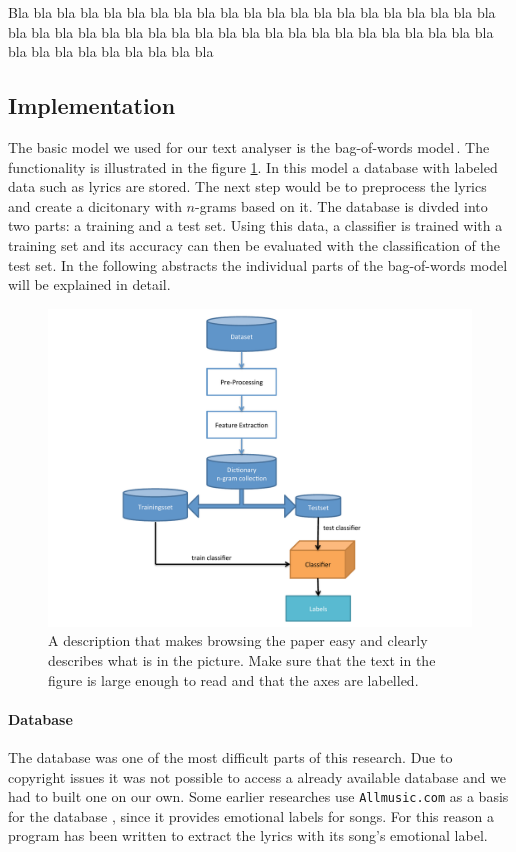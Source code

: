 \documentclass[a4paper,12pt]{article}
\begin{document}
Bla bla bla bla bla bla bla bla bla bla bla bla bla bla bla bla bla 
bla bla bla bla bla bla bla bla bla bla bla bla bla bla bla bla bla 
bla bla bla bla bla bla bla bla bla bla bla bla bla bla bla bla bla 

\subsection{Implementation}
\label{sec:impl}

The basic model we used for our text analyser is the bag-of-words model\,\cite{Mitchell}. The functionality is illustrated in the figure \ref{fig:bagOfWords}. In this model a database with labeled data such as lyrics are stored. The next step would be to preprocess the lyrics and create a dicitonary with $n$-grams based on it. The database is divded into two parts: a training and a test set. Using this data, a classifier is trained with a training set and its accuracy can then be evaluated with the classification of the test set. In the following abstracts the individual parts of the bag-of-words model will be explained in detail. 

\begin{figure}
\centering
\includegraphics[width=0.8\linewidth]{flowChartBagOfWords}
\caption{A description that makes browsing the paper easy and clearly 
describes what is in the picture. Make sure that the text in the figure 
is large enough to read and that the axes are labelled.}
\label{fig:bagOfWords}
\end{figure}

\paragraph{Database} The database was one of the most difficult parts of this research. Due to copyright issues it was not possible to access a already available database and we had to built one on our own. Some earlier researches use \texttt{Allmusic.com} as a basis for the database \cite{kim2010music}, since it provides emotional labels for songs. For this reason a program has been written to extract the lyrics with its song's emotional label. 
\end{document}
